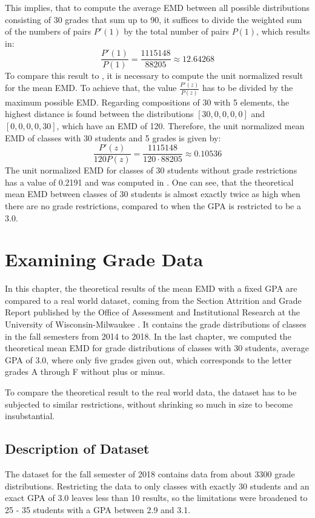 \documentclass[12pt,letterpaper,oneside,openany]{book}
\begin{document}
This implies, that to compute the average EMD between all possible distributions consisting of 30 grades that sum up to 90, it suffices to divide the weighted sum of the numbers of pairs $P'(1)$ by the total number of pairs $P(1)$, which results in:
$$\frac{P'(1)}{P(1)}=\frac{1115148}{88205} \approx 12.64268$$
To compare this result to \cite{bourn2019expected}, it is necessary to compute the unit normalized result for the mean EMD. To achieve that, the value $\frac{P'(z)}{P(z)}$ has to be divided by the maximum possible EMD. Regarding compositions of 30 with 5 elements, the highest distance is found between the distributions  $[30, 0, 0, 0, 0]$ and $[0, 0, 0, 0, 30]$, which have an EMD of 120.
Therefore, the unit normalized mean EMD of classes with 30 students and 5 grades is given by:
$$\frac{P'(z)}{120P(z)} = \frac{1115148}{120\cdot 88205} \approx 0.10536$$
The unit normalized EMD for classes of 30 students without grade restrictions has a value of 0.2191 and was computed in \cite{bourn2019expected}. 
One can see, that the theoretical mean EMD between classes of 30 students is almost exactly twice as high when there are no grade restrictions, compared to when the GPA is restricted to be a 3.0.


\setcounter{chapter}{3}
\setcounter{table}{0}
\chapter{Examining Grade Data}
In this chapter, the theoretical results of the mean EMD with a fixed GPA are compared to  a real world dataset, coming from the Section Attrition and Grade Report published by the Office of Assessment and Institutional Research at the University of Wisconsin-Milwaukee \cite{gradeData}. It contains the grade distributions of classes in the fall semesters from 2014 to 2018.
In the last chapter, we computed the theoretical mean EMD for grade distributions of classes with 30 students, average GPA of 3.0, where only five  grades given out, which corresponds to the letter grades A through F without plus or minus.

To compare the theoretical result to the real world data, the dataset has to be subjected to similar restrictions, without shrinking so much in size to become insubstantial.


\setcounter{section}{0}
\section{Description of Dataset}
The dataset for the fall semester of 2018 contains data from about 3300 grade distributions. Restricting the data to only classes with exactly 30 students and an exact GPA of 3.0 leaves less than 10 results, so the limitations were broadened to 25 - 35 students with a GPA between 2.9 and 3.1. 
\end{document}
